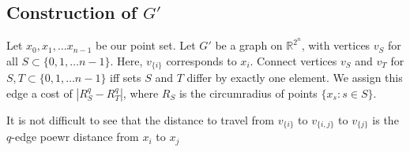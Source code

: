 \subsection{Construction of $G'$}

Let $x_0, x_1, \ldots x_{n-1}$ be our point set.
Let $G'$ be a graph on $\mathbb{R}^{2^n}$, with vertices $v_{S}$ for all $S
\subset \{0,1,\ldots n-1\}$. Here, $v_{\{i\}}$ corresponds to $x_i$. Connect vertices $v_S$ and $v_T$ for $S, T \subset
\{0, 1, \ldots n-1\}$ iff sets $S$ and $T$ differ by exactly one element. We
assign this edge a cost of $|R_{S}^q - R_{T}^q|$, where $R_{S}$ is the
circumradius of points $\{x_s : s \in S\}$.

It is not difficult to see that the distance to travel from $v_{\{i\}}$ to $v_{\{i,
j\}}$ to $v_{\{j\}}$ is the $q$-edge poewr distance from $x_i$ to $x_j$
